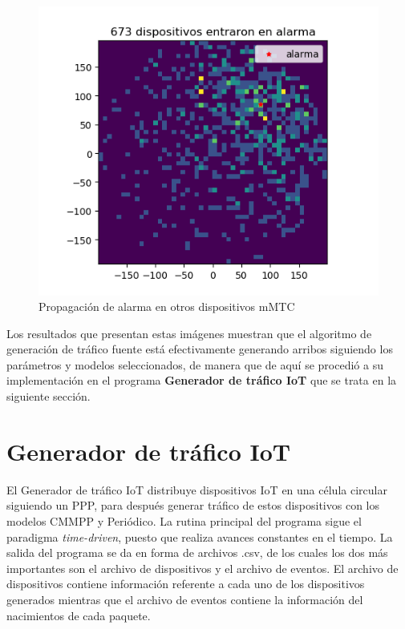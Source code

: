 \begin{figure}[th]
    \centering
    \includegraphics[scale=.7]{Figures/UEs_de_tipo_Otros_dispositivos_mMTC_activados_por_una_alarma.png}
    \decoRule
    \caption[Propagación de alarma en otros dispositivos mMTC]{Propagación de alarma en otros dispositivos mMTC}
    \label{fig:propagacion2}
\end{figure}

Los resultados que presentan estas imágenes muestran que el algoritmo de generación de tráfico fuente está efectivamente generando arribos siguiendo los parámetros y modelos seleccionados, de manera que de aquí se procedió a su implementación en el programa \textbf{Generador de tráfico IoT} que se trata en la siguiente sección. \newline

\hfill

\break


\section{Generador de tráfico IoT} \label{generadortraficoiot}

    El Generador de tráfico IoT distribuye dispositivos IoT en una célula circular siguiendo un PPP, para después generar tráfico de estos dispositivos con los modelos CMMPP y Periódico. La rutina principal del programa sigue el paradigma \textit{time-driven}, puesto que realiza avances constantes en el tiempo. La salida del programa se da en forma de archivos .csv, de los cuales los dos más importantes son el archivo de dispositivos y el archivo de eventos. El archivo de dispositivos contiene información referente a cada uno de los dispositivos generados mientras que el archivo de eventos contiene la información del nacimientos de cada paquete.\newline


